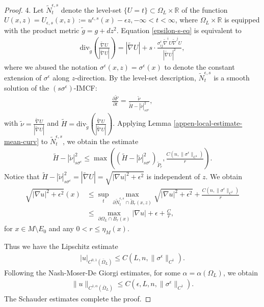 \documentclass[10pt,a4paper]{amsart}
\begin{document}
\begin{proof}
4. Let $\tilde{N}_t ^{\epsilon ,s}$ denote the level-set $\{U = t\} \subset \Omega _{L} \times \mathbb{R} $ of the function $U(x,z)=U_{\epsilon ,s}(x, z) := u^{\epsilon ,s}(x) - \epsilon z, -\infty< t < \infty$, where $\Omega _{L} \times \mathbb{R}$ is equipped with the product metric $\tilde{g}= g + d z^2$. Equation \ref{epsilon-s-eq} is equivalent to
\begin{align*}
	\mathrm{div}_{\tilde{g}}\left( \frac{\tilde{\nabla } U}{|\tilde{\nabla } U|} \right)  = |\tilde{\nabla }U| + s\cdot  \frac{\sigma _{ij} ^{\epsilon }\tilde{\nabla}^i U \tilde{\nabla} ^j U}{|\tilde{\nabla} U|^2 },
\end{align*}
where we abused the notation $\sigma ^{\epsilon } (x,z) = \sigma ^{\epsilon } (x)$ to denote the constant extension of $\sigma ^{\epsilon } $ along $z$-direction. By the level-set description, $\tilde{N}_t ^{\epsilon ,s}$ is a smooth solution of the $(s \sigma^{\epsilon }) $-IMCF:
\begin{align*}
	\frac{\partial \tilde{F}}{\partial t} = \frac{\tilde{\nu }}{\tilde{H}- |\tilde{\nu }|^2_{s \sigma ^{\epsilon } }},
\end{align*} 
with $\tilde{\nu } = \frac{\tilde{\nabla }U}{|\tilde{\nabla }U|}$ and $\tilde{H} = \mathrm{div}_{\tilde{g}}\left( \frac{\tilde{\nabla } U}{|\tilde{\nabla } U|} \right) $.  
Applying Lemma \ref{appen-local-estimate-mean-curv} to $\tilde{N}^{\epsilon ,s}_t$, we obtain the estimate
\begin{align*}
	 \tilde{H} - |\tilde{\nu }|^2_{s\sigma ^{\epsilon } } \leq \max \left( (\tilde{H}-|\tilde{\nu }|^2_{s\sigma ^{\epsilon } })_{\tilde{P}_r}, \frac{C(n, \|\sigma ^{\epsilon } \|_{C^1})}{r} \right) .
\end{align*}
Notice that $\tilde{H} - |\tilde{\nu }|^2_{s\sigma ^{\epsilon } } = |\tilde{\nabla }U| = \sqrt{|\nabla u |^2+ \epsilon ^2}  $ is independent of $z$. We obtain
\begin{align*}
	\sqrt{|\nabla u |^2+ \epsilon ^2}(x) &\leq \sup_{t} \max_{\partial \tilde{N}^{\epsilon ,s}_{t} \cap \tilde{B}_r(x,z)} \sqrt{|\nabla u |^2+ \epsilon ^2} + \frac{C(n, \|\sigma ^{\epsilon } \|_{C^1})}{r} \\
	&\leq \max_{\partial \Omega _{L} \cap B_r(x)} |\nabla u| + \epsilon + \frac{C}{r},
\end{align*} 
for $x \in M \setminus E_0$ and any $0<r \leq \eta _M(x)$. 

Thus we have the Lipschitz estimate
\begin{align*}
	|u|_{C^{0,1}(\bar{\Omega }_{L})} \leq C(L, n, \|\sigma ^{\epsilon } \|_{C^1}).
\end{align*} 
Following the Nash-Moser-De Giorgi estimates, for some $\alpha =\alpha (\Omega _{L})$, we obtain
\begin{align*}
	\|u\|_{C^{1, \alpha }(\bar{\Omega }_{L})} \leq C(\epsilon ,L,n, \|\sigma ^{\epsilon } \|_{C^1}).
\end{align*} 
The Schauder estimates complete the proof.

\end{proof}
\end{document}
